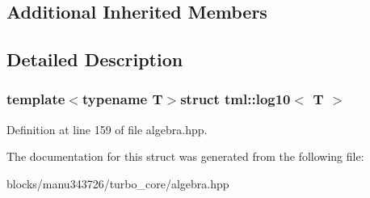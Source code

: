 \subsection*{Additional Inherited Members}


\subsection{Detailed Description}
\subsubsection*{template$<$typename T$>$struct tml\+::log10$<$ T $>$}



Definition at line 159 of file algebra.\+hpp.



The documentation for this struct was generated from the following file\+:\begin{DoxyCompactItemize}
\item 
blocks/manu343726/turbo\+\_\+core/algebra.\+hpp\end{DoxyCompactItemize}
